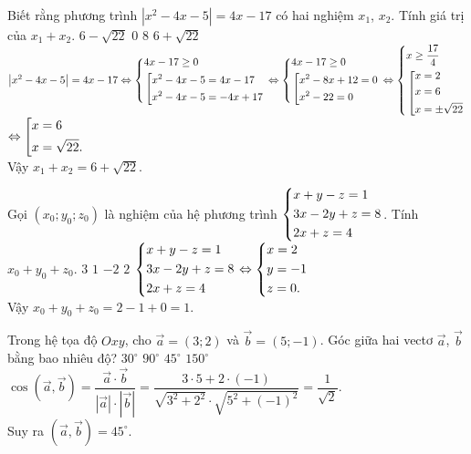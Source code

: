 \begin{ex}%
 Biết rằng phương trình $\left|x^2 - 4x - 5\right| = 4x - 17$ có hai nghiệm $x_1$, $x_2$. Tính giá trị của $x_1 + x_2$.
 \choice
  {$6 - \sqrt{22}$}
  {$0$}
  {$8$}
  {\True $6 + \sqrt{22}$}
 \loigiai
 {
 $\left|x^2 - 4x - 5\right| = 4x - 17 \Leftrightarrow \left\{\begin{aligned}& 4x - 17 \geq 0 \\& \left[\begin{aligned}&x^2-4x-5=4x-17\\& x^2-4x-5=-4x+17\end{aligned}\right.\end{aligned}\right. \Leftrightarrow \left\{\begin{aligned}& 4x - 17 \geq 0 \\& \left[\begin{aligned}&x^2-8x+12=0 \\& x^2-22=0\end{aligned}\right.\end{aligned}\right. \Leftrightarrow \left\{\begin{aligned}& x \geq \dfrac{17}{4} \\& \left[\begin{aligned}& x=2 \\& x=6 \\& x= \pm \sqrt{22}\end{aligned}\right.\end{aligned}\right.$\\
 $\Leftrightarrow \left[\begin{aligned}& x = 6 \\& x = \sqrt{22}.\end{aligned}\right.$\\
 Vậy $x_1 + x_2 = 6 + \sqrt{22}$.
 }
\end{ex}


\begin{ex}%
 Gọi $(x_0; y_0; z_0)$ là nghiệm của hệ phương trình $\left\{\begin{aligned}& x + y - z = 1 \\& 3x - 2y + z = 8 \\& 2x + z = 4\end{aligned}\right.$. Tính $x_0 + y_0 + z_0$.
 \choice
  {$3$}
  {\True $1$}
  {$-2$}
  {$2$}
 \loigiai
 {
 $\left\{\begin{aligned}& x + y - z = 1 \\& 3x - 2y + z = 8 \\& 2x + z = 4\end{aligned}\right. \Leftrightarrow \left\{\begin{aligned}& x=2 \\& y=-1 \\& z=0.\end{aligned}\right.$\\
 Vậy $x_0 + y_0 + z_0 = 2 - 1 + 0 = 1$.
 }
\end{ex}


\begin{ex}%
 Trong hệ tọa độ $Oxy$, cho $\vec{a} = (3; 2)$ và $\vec{b} = (5; -1)$. Góc giữa hai vectơ $\vec{a}$, $\vec{b}$ bằng bao nhiêu độ?
 \choice
  {$30^\circ$}
  {$90^\circ$}
  {\True $45^\circ$}
  {$150^\circ$}
 \loigiai
 {
 $\cos \left(\vec{a},\vec{b}\right) = \dfrac{\vec{a} \cdot \vec{b}}{\left|\vec{a} \right| \cdot \left|\vec{b} \right|} = \dfrac{3 \cdot 5 + 2 \cdot (-1)}{\sqrt{3^2 + 2^2} \cdot \sqrt{5^2 + (-1)^2}} = \dfrac{1}{\sqrt{2}}$.\\
 Suy ra $\left(\vec{a},\vec{b}\right) = 45^\circ$.
 }
\end{ex}


